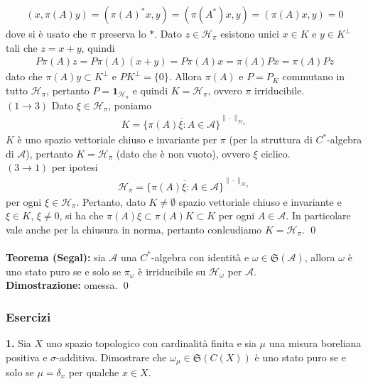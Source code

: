 \documentclass{article}
\numberwithin{equation}{subsection}
\begin{document}
\begin{align*}
    (x, \pi(A)y) = (\pi(A)^*x, y) = (\pi(A^*)x, y) = (\pi(A)x, y) = 0
\end{align*}
dove si è usato che $\pi$ preserva lo $*$. Dato $z \in \mathcal{H}_\pi$ esistono unici $x \in K$ e $y \in K^\perp$ tali che $z = x + y$, quindi
\begin{align*}
    P\pi(A)z = P\pi(A)(x + y) = P\pi(A)x = \pi(A)Px = \pi(A)Pz
\end{align*}
dato che $\pi(A)y \subset K^\perp$ e $PK^\perp = \{0\}$. Allora $\pi(A)$ e $P = P_K$ commutano in tutto $\mathcal{H}_\pi$, pertanto $P = \mathbf{1}_{\mathcal{H}_\pi}$ e quindi $K = \mathcal{H}_\pi$, ovvero $\pi$ irriducibile. \\
$(1 \rightarrow 3)$ Dato $\xi \in \mathcal{H}_\pi$, poniamo
\begin{align*}
    K = \overline{\{\pi(A)\xi : A \in \mathscr{A}\}}^{\|\cdot\|_{\mathcal{H}_\pi}}
\end{align*}
$K$ è uno spazio vettoriale chiuso e invariante per $\pi$ (per la struttura di $C^*$-algebra di $\mathscr{A}$), pertanto $K = \mathcal{H}_\pi$ (dato che è non vuoto), ovvero $\xi$ ciclico. \\
$(3 \rightarrow 1)$ per ipotesi
\begin{align*}
    \mathcal{H}_\pi = \overline{\{\pi(A)\xi : A \in \mathscr{A}\}}^{\|\cdot\|_{\mathcal{H}_\pi}}
\end{align*}
per ogni $\xi \in \mathcal{H}_\pi$. Pertanto, dato $K \neq \emptyset$ spazio vettoriale chiuso e invariante e $\xi \in K$, $\xi \neq 0$, si ha che $\pi(A)\xi \subset \pi(A)K \subset K$ per ogni $A \in \mathscr{A}$. In particolare vale anche per la chiusura in norma, pertanto conlcudiamo $K = \mathcal{H}_\pi$. \qed \\ \\
\textbf{Teorema (Segal):} sia $\mathscr{A}$ una $C^*$-algebra con identità e $\omega \in \mathfrak{S}(\mathscr{A})$, allora $\omega$ è uno stato puro se e solo se $\pi_\omega$ è irriducibile su $\mathcal{H}_\omega$ per $\mathscr{A}$. \\

\textbf{Dimostrazione:} omessa. \qed 

\subsubsection{Esercizi}
\textbf{1.} Sia $X$ uno spazio topologico con cardinalità finita e sia $\mu$ una misura boreliana positiva e $\sigma$-additiva. Dimostrare che $\omega_\mu \in \mathfrak{S}(C(X))$ è uno stato puro se e solo se $\mu = \delta_x$ per qualche $x \in X$. \\
\end{document}
